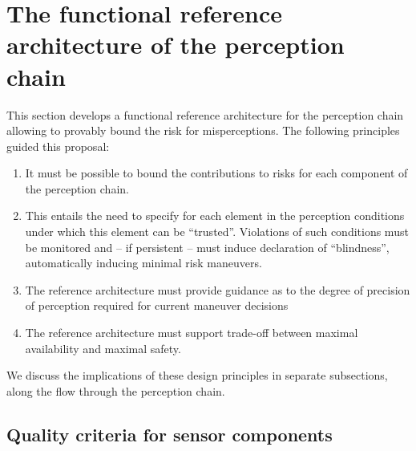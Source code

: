 \section{The functional reference architecture of the perception chain}\label{sec:refarchitecture}
This section develops a functional reference architecture for the perception chain allowing to provably bound the risk for misperceptions. The following principles guided this proposal:
\begin{enumerate}
\item It must be possible to bound the contributions to risks for each component of the perception chain.
\item This entails the need to specify for each element in the perception conditions under which this element can be \enquote{trusted}. Violations of such conditions must be monitored and -- if persistent -- must induce declaration of \enquote{blindness}, automatically inducing minimal risk maneuvers.
\item The reference architecture must provide guidance as to the degree of precision of perception required for current maneuver decisions
\item The reference architecture must support trade-off between maximal availability and maximal safety.
\end{enumerate}
We discuss the implications of these design principles in separate subsections, along the flow through the perception chain.

\subsection{Quality criteria for sensor components}\label{subsec:quality}

